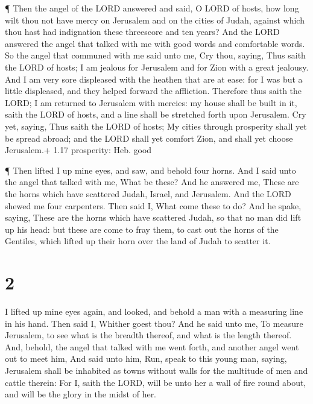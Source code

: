  ¶ Then the angel of the LORD answered and said, O LORD of
hosts, how long wilt thou not have mercy on Jerusalem and on the cities
of Judah, against which thou hast had indignation these threescore and
ten years?  And the LORD answered the angel that talked
with me with good words and comfortable words.  So the
angel that communed with me said unto me, Cry thou, saying, Thus saith
the LORD of hosts; I am jealous for Jerusalem and for Zion with a great
jealousy.  And I am very sore displeased with the heathen
that are at ease: for I was but a little displeased, and they helped
forward the affliction.  Therefore thus saith the LORD; I
am returned to Jerusalem with mercies: my house shall be built in it,
saith the LORD of hosts, and a line shall be stretched forth upon
Jerusalem.  Cry yet, saying, Thus saith the LORD of hosts;
My cities through prosperity shall yet be spread abroad; and the LORD
shall yet comfort Zion, and shall yet choose Jerusalem.+ 1.17
prosperity: Heb. good

 ¶ Then lifted I up mine eyes, and saw, and behold four
horns.  And I said unto the angel that talked with me, What
be these? And he answered me, These are the horns which have scattered
Judah, Israel, and Jerusalem.  And the LORD shewed me four
carpenters.  Then said I, What come these to do? And he
spake, saying, These are the horns which have scattered Judah, so that
no man did lift up his head: but these are come to fray them, to cast
out the horns of the Gentiles, which lifted up their horn over the land
of Judah to scatter it.

\hypertarget{section-1}{%
\section{2}\label{section-1}}

 I lifted up mine eyes again, and looked, and behold a man
with a measuring line in his hand.  Then said I, Whither
goest thou? And he said unto me, To measure Jerusalem, to see what is
the breadth thereof, and what is the length thereof.  And,
behold, the angel that talked with me went forth, and another angel went
out to meet him,  And said unto him, Run, speak to this
young man, saying, Jerusalem shall be inhabited as towns without walls
for the multitude of men and cattle therein:  For I, saith
the LORD, will be unto her a wall of fire round about, and will be the
glory in the midst of her.

